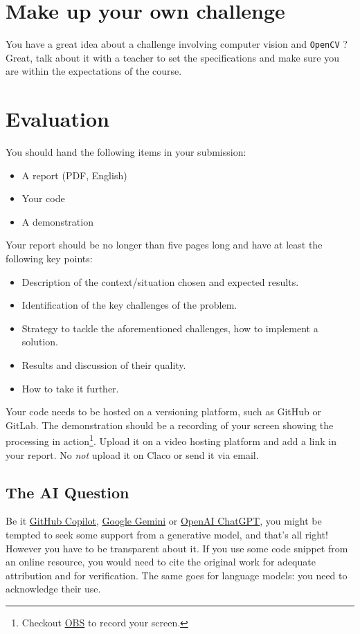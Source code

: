 \documentclass{labo}
\newcommand{\opencv}{\texttt{OpenCV} }
\begin{document}
\section*{Make up your own challenge}
You have a great idea about a challenge involving computer vision and \opencv? Great, talk about it with a teacher to set the specifications and make sure you are within the expectations of the course.


\section*{Evaluation}
You should hand the following items in your submission:
\begin{itemize}
	\item A report (PDF, English)
	\item Your code
	\item A demonstration
\end{itemize}

Your report should be no longer than five pages long and have at least the following key points:
\begin{itemize}
	\item Description of the context/situation chosen and expected results.
	\item Identification of the key challenges of the problem.
	\item Strategy to tackle the aforementioned challenges, how to implement a solution.
	\item Results and discussion of their quality.
	\item How to take it further.
\end{itemize}

Your code needs to be hosted on a versioning platform, such as GitHub or GitLab.
The demonstration should be a recording of your screen showing the processing in action\footnote{Checkout \href{https://obsproject.com/}{OBS} to record your screen.}. Upload it on a video hosting platform and add a link in your report. No \textit{not} upload it on Claco or send it via email.

\subsection*{The AI Question}
Be it \href{https://github.com/features/copilot}{GitHub Copilot}, \href{https://gemini.google.com/}{Google Gemini} or \href{https://chat.openai.com}{OpenAI ChatGPT}, you might be tempted to seek some support from a generative model, and that's all right!
However you have to be transparent about it.
If you use some code snippet from an online resource, you would need to cite the original work for adequate attribution and for verification. The same goes for language models: you need to acknowledge their use.
\end{document}
